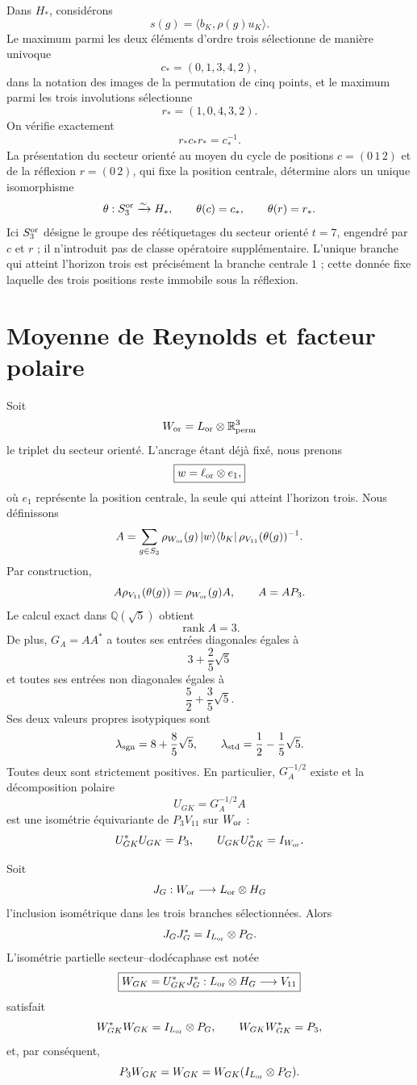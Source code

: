 Dans \(H_*\), considérons
\[
 s(g)=\langle b_K,\rho(g)u_K\rangle.
\]
Le maximum parmi les deux éléments d'ordre trois sélectionne de manière univoque
\[
 c_*=(0,1,3,4,2),
\]
dans la notation des images de la permutation de cinq points, et le maximum parmi
les trois involutions sélectionne
\[
 r_*=(1,0,4,3,2).
\]
On vérifie exactement
\[
 r_*c_*r_*=c_*^{-1}.
\]
La présentation du secteur orienté au moyen du cycle de positions
\(c=(0\,1\,2)\) et de la réflexion \(r=(0\,2)\), qui fixe la position centrale,
détermine alors un unique isomorphisme
\[
 \theta:S_3^{\rm or}\xrightarrow{\sim}H_*,
 \qquad
 \theta(c)=c_*,
 \qquad
 \theta(r)=r_*.
\]
Ici \(S_3^{\rm or}\) désigne le groupe des réétiquetages du secteur orienté
\(t=7\), engendré par \(c\) et \(r\) ; il n'introduit pas de classe opératoire
supplémentaire.
L'unique branche qui atteint l'horizon trois est précisément la branche centrale
\(1\) ; cette donnée fixe laquelle des trois positions reste immobile sous la
réflexion.

\section{Moyenne de Reynolds et facteur polaire}

Soit
\[
 W_{\rm or}=L_{\rm or}\otimes\mathbb R^3_{\rm perm}
\]
le triplet du secteur orienté. L'ancrage étant déjà fixé, nous prenons
\[
 \boxed{w=\ell_{\rm or}\otimes e_1,}
\]
où \(e_1\) représente la position centrale, la seule qui atteint l'horizon
trois. Nous définissons
\[
 A
 =\sum_{g\in S_3}
 \rho_{W_{\rm or}}(g)\,
 |w\rangle\langle b_K|\,
 \rho_{V_{11}}(\theta(g))^{-1}.
\]
Par construction,
\[
 A\rho_{V_{11}}(\theta(g))
 =\rho_{W_{\rm or}}(g)A,
\qquad
 A=AP_3.
\]
Le calcul exact dans \(\mathbb Q(\sqrt5)\) obtient
\[
 \operatorname{rank}A=3.
\]
De plus, \(G_A=AA^*\) a toutes ses entrées diagonales égales à
\[
 3+\frac25\sqrt5
\]
et toutes ses entrées non diagonales égales à
\[
 \frac52+\frac35\sqrt5.
\]
Ses deux valeurs propres isotypiques sont
\[
 \lambda_{\rm sgn}=8+\frac85\sqrt5,
 \qquad
 \lambda_{\rm std}=\frac12-\frac15\sqrt5.
\]
Toutes deux sont strictement positives. En particulier, \(G_A^{-1/2}\) existe et
la décomposition polaire
\[
 \boxed{U_{GK}=G_A^{-1/2}A}
\]
est une isométrie équivariante de \(P_3V_{11}\) sur \(W_{\rm or}\) :
\[
 U_{GK}^*U_{GK}=P_3,
 \qquad
 U_{GK}U_{GK}^*=I_{W_{\rm or}}.
\]

Soit
\[
 J_G:W_{\rm or}\longrightarrow L_{\rm or}\otimes H_G
\]
l'inclusion isométrique dans les trois branches sélectionnées. Alors
\[
 J_GJ_G^*=I_{L_{\rm or}}\otimes P_G.
\]
L'isométrie partielle secteur--dodécaphase est notée
\[
 \boxed{
 W_{GK}=U_{GK}^*J_G^*
 :L_{\rm or}\otimes H_G\longrightarrow V_{11}
 }
\]
satisfait
\[
 W_{GK}^*W_{GK}
 =I_{L_{\rm or}}\otimes P_G,
\qquad
 W_{GK}W_{GK}^*=P_3,
\]
et, par conséquent,
\[
 P_3W_{GK}
 =W_{GK}
 =W_{GK}(I_{L_{\rm or}}\otimes P_G).
\]

